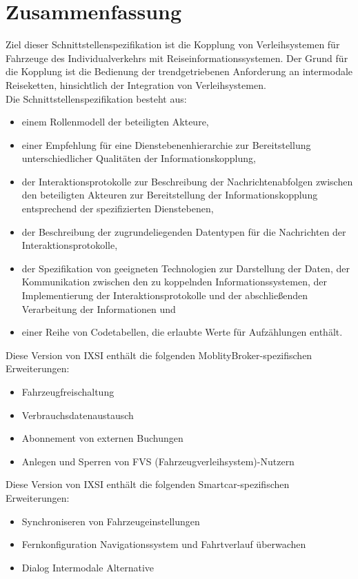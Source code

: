 \chapter{Zusammenfassung}
\label{cha:Zusammenfassung}

Ziel dieser Schnittstellenspezifikation ist die Kopplung von Verleihsystemen für Fahrzeuge des Individualverkehrs mit Reiseinformationssystemen. Der Grund für die Kopplung ist die Bedienung der trendgetriebenen Anforderung an intermodale Reiseketten,  hinsichtlich der Integration von Verleihsystemen.\\

Die Schnittstellenspezifikation besteht aus:\begin{itemize}
\item einem Rollenmodell der beteiligten Akteure,
\item einer Empfehlung für eine Dienstebenenhierarchie zur Bereitstellung unterschiedlicher Qualitäten der Informationskopplung,
\item der Interaktionsprotokolle zur Beschreibung der Nachrichtenabfolgen zwischen den beteiligten Akteuren zur Bereitstellung der Informationskopplung entsprechend der spezifizierten Dienstebenen,
\item der Beschreibung der zugrundeliegenden Datentypen für die Nachrichten der Interaktionsprotokolle,
\item der Spezifikation von geeigneten Technologien zur Darstellung der Daten, der Kommunikation zwischen den zu koppelnden Informationssystemen, der Implementierung der Interaktionsprotokolle und der abschließenden Verarbeitung der Informationen und
\item einer Reihe von Codetabellen, die erlaubte Werte für Aufzählungen enthält.
\end{itemize}
\bigskip
Diese Version von IXSI enthält die folgenden MoblityBroker-spezifischen Erweiterungen:
\begin{itemize}
\item Fahrzeugfreischaltung
\item Verbrauchsdatenaustausch
\item Abonnement von externen Buchungen
\item Anlegen und Sperren von FVS (Fahrzeugverleihsystem)-Nutzern
\end{itemize}
Diese Version von IXSI enthält die folgenden Smartcar-spezifischen Erweiterungen:
\begin{itemize}
\item Synchroniseren von Fahrzeugeinstellungen
\item Fernkonfiguration Navigationssystem und Fahrtverlauf überwachen
\item Dialog Intermodale Alternative
\end{itemize}
